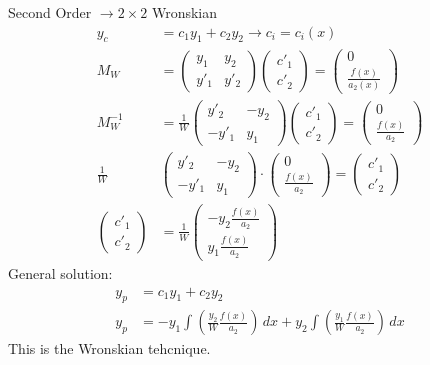\documentclass[Maths.tex]{subfiles}
\begin{document}
\begin{example}[2nd Order]
Second Order $\to 2\times2$ Wronskian
\begin{align*}
    y_c &= c_1y_1 + c_2y_2 \to c_i = c_i(x) \\
    M_W &= \begin{pmatrix} y_1 & y_2 \\ y'_1 & y'_2 \end{pmatrix}\begin{pmatrix} c'_1 \\ c'_2 \end{pmatrix} = \begin{pmatrix} 0 \\ \frac{f(x)}{a_2(x)} \end{pmatrix} \\
    M_W^{-1} &= \frac{1}{W} \begin{pmatrix} y'_2 & -y_2 \\ -y'_1 & y_1 \end{pmatrix} \begin{pmatrix} c'_1 \\ c'_2 \end{pmatrix} = \begin{pmatrix} 0 \\ \frac{f(x)}{a_2} \end{pmatrix} \\
    \frac{1}{W}&\begin{pmatrix} y'_2 & -y_2 \\ -y'_1 & y_1 \end{pmatrix}\cdot \begin{pmatrix} 0 \\ \frac{f(x)}{a_2} \end{pmatrix} = \begin{pmatrix} c'_1 \\ c'_2 \end{pmatrix} \\
    \begin{pmatrix} c'_1 \\ c'_2 \end{pmatrix} &= \frac{1}{W}\begin{pmatrix} -y_2\frac{f(x)}{a_2} \\ y_1\frac{f(x)}{a_2} \end{pmatrix}
\end{align*}
General solution:
\begin{align*}
    y_p &= c_1y_1 + c_2y_2 \\
    y_p &= -y_1\int \left(\frac{y_2}{W}\frac{f(x)}{a_2}\right)\,dx + y_2\int \left(\frac{y_1}{W}\frac{f(x)}{a_2}\right)\,dx
\end{align*}
This is the Wronskian tehcnique.
\end{example}
\end{document}
